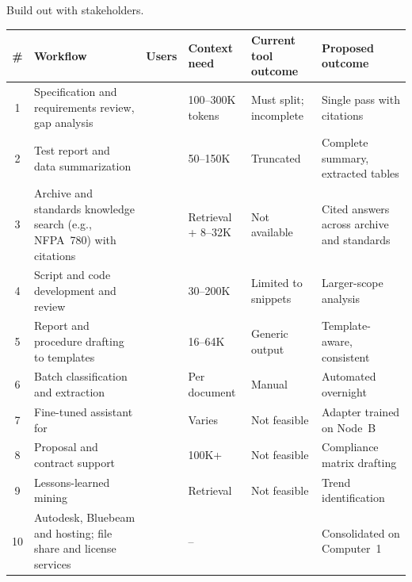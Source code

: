 
Build out with stakeholders.

{\footnotesize
\begin{xltabular}{\textwidth}{@{}c Y{1.405} c Y{0.649} Y{0.973} Y{0.973}@{}}
  \toprule
  \# & Workflow & Users & Context need & Current tool outcome & Proposed outcome \\
  \midrule
   & Specification and requirements review, gap analysis & \PH{ } & 100--300K tokens & Must split; incomplete & Single pass with citations \\
  2 & Test report and data summarization & \PH{ } & 50--150K & Truncated & Complete summary, extracted tables \\
  3 & Archive and standards knowledge search (e.g., NFPA~780) with citations & \PH{ } & Retrieval + 8--32K & Not available & Cited answers across archive and standards \\
  4 & Script and code development and review & \PH{ } & 30--200K & Limited to snippets & Larger-scope analysis \\
  5 & Report and procedure drafting to templates & \PH{ } & 16--64K & Generic output & Template-aware, consistent \\
  6 & Batch classification and extraction & \PH{ } & Per document & Manual & Automated overnight \\
  7 & Fine-tuned assistant for  & \PH{ } & Varies & Not feasible & Adapter trained on Node~B \\
  8 & Proposal and contract support & \PH{ } & 100K+ & Not feasible & Compliance matrix drafting \\
  9 & Lessons-learned mining & \PH{ } & Retrieval & Not feasible & Trend identification \\
  10 & Autodesk, Bluebeam and  hosting; file share and license services & \PH{ } & -- &  & Consolidated on Computer~1 \\
  \bottomrule
\end{xltabular}}
